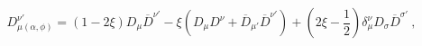 \begin{equation}
D_{\mu(\alpha,\phi)}^{\nu'}=(1-2\xi)D_\mu{\overline{D}}^{\nu'}-\xi (D_\mu D^\nu
+\overline{D}_{\mu'}\overline{D}^{\nu'})+(2\xi-\frac12)\delta_\mu^\nu D_{\sigma}
\overline{D}^{\sigma'} \ ,
\label{46}
\end{equation}

